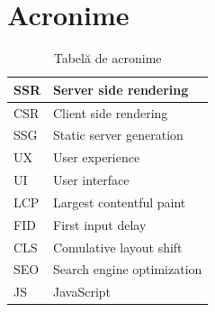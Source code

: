 \documentclass[12pt, a4paper]{report}
\begin{document}
\section{Acronime}

\begin{table} [H]
	\begin{tabular} {|  l | L{10cm} |}
		\hline
		SSR & Server side rendering      \\ [0.2ex]
		\hline
		CSR & Client side rendering      \\ [0.2ex]
		\hline
		SSG & Static server generation   \\ [0.2ex]
		\hline
		UX  & User experience            \\ [0.2ex]
		\hline
		UI  & User interface             \\ [0.2ex]
		\hline
		LCP & Largest contentful paint   \\ [0.2ex]
		\hline
		FID & First input delay          \\ [0.2ex]
		\hline
		CLS & Comulative layout shift    \\ [0.2ex]
		\hline
		SEO & Search engine optimization \\ [0.2ex]
		\hline
		JS  & JavaScript                 \\ [0.2ex]
		\hline
	\end{tabular}
	\caption{Tabelă de acronime}
	\label{table:acron}
\end{table}

\end{document}
